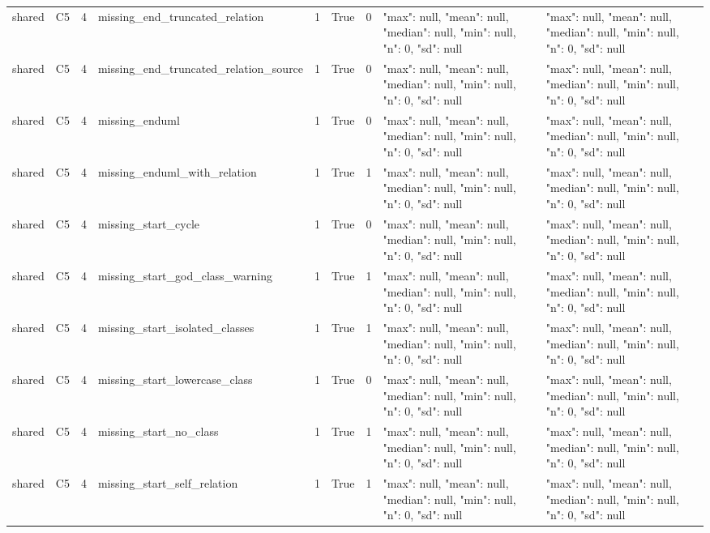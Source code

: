 \begin{tabular}{lllllllll}
shared & C5 & 4 & missing\_end\_truncated\_relation & 1 & True & 0 & {"max": null, "mean": null, "median": null, "min": null, "n": 0, "sd": null} & {"max": null, "mean": null, "median": null, "min": null, "n": 0, "sd": null} \\
shared & C5 & 4 & missing\_end\_truncated\_relation\_source & 1 & True & 0 & {"max": null, "mean": null, "median": null, "min": null, "n": 0, "sd": null} & {"max": null, "mean": null, "median": null, "min": null, "n": 0, "sd": null} \\
shared & C5 & 4 & missing\_enduml & 1 & True & 0 & {"max": null, "mean": null, "median": null, "min": null, "n": 0, "sd": null} & {"max": null, "mean": null, "median": null, "min": null, "n": 0, "sd": null} \\
shared & C5 & 4 & missing\_enduml\_with\_relation & 1 & True & 1 & {"max": null, "mean": null, "median": null, "min": null, "n": 0, "sd": null} & {"max": null, "mean": null, "median": null, "min": null, "n": 0, "sd": null} \\
shared & C5 & 4 & missing\_start\_cycle & 1 & True & 0 & {"max": null, "mean": null, "median": null, "min": null, "n": 0, "sd": null} & {"max": null, "mean": null, "median": null, "min": null, "n": 0, "sd": null} \\
shared & C5 & 4 & missing\_start\_god\_class\_warning & 1 & True & 1 & {"max": null, "mean": null, "median": null, "min": null, "n": 0, "sd": null} & {"max": null, "mean": null, "median": null, "min": null, "n": 0, "sd": null} \\
shared & C5 & 4 & missing\_start\_isolated\_classes & 1 & True & 1 & {"max": null, "mean": null, "median": null, "min": null, "n": 0, "sd": null} & {"max": null, "mean": null, "median": null, "min": null, "n": 0, "sd": null} \\
shared & C5 & 4 & missing\_start\_lowercase\_class & 1 & True & 0 & {"max": null, "mean": null, "median": null, "min": null, "n": 0, "sd": null} & {"max": null, "mean": null, "median": null, "min": null, "n": 0, "sd": null} \\
shared & C5 & 4 & missing\_start\_no\_class & 1 & True & 1 & {"max": null, "mean": null, "median": null, "min": null, "n": 0, "sd": null} & {"max": null, "mean": null, "median": null, "min": null, "n": 0, "sd": null} \\
shared & C5 & 4 & missing\_start\_self\_relation & 1 & True & 1 & {"max": null, "mean": null, "median": null, "min": null, "n": 0, "sd": null} & {"max": null, "mean": null, "median": null, "min": null, "n": 0, "sd": null} \\

\end{tabular}
